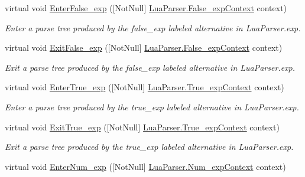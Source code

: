 \begin{DoxyCompactItemize}
virtual void \mbox{\hyperlink{classzlua_1_1_lua_base_listener_a5025dfe7f75ae2d9db0e58eadba0bba0}{Enter\+False\+\_\+exp}} (\mbox{[}Not\+Null\mbox{]} \mbox{\hyperlink{classzlua_1_1_lua_parser_1_1_false__exp_context}{Lua\+Parser.\+False\+\_\+exp\+Context}} context)
\begin{DoxyCompactList}\small\item\em Enter a parse tree produced by the {\ttfamily false\+\_\+exp} labeled alternative in Lua\+Parser.\+exp. \end{DoxyCompactList}\item 
virtual void \mbox{\hyperlink{classzlua_1_1_lua_base_listener_a6094ac0c604fce8ffab9ccfcf3023c52}{Exit\+False\+\_\+exp}} (\mbox{[}Not\+Null\mbox{]} \mbox{\hyperlink{classzlua_1_1_lua_parser_1_1_false__exp_context}{Lua\+Parser.\+False\+\_\+exp\+Context}} context)
\begin{DoxyCompactList}\small\item\em Exit a parse tree produced by the {\ttfamily false\+\_\+exp} labeled alternative in Lua\+Parser.\+exp. \end{DoxyCompactList}\item 
virtual void \mbox{\hyperlink{classzlua_1_1_lua_base_listener_a1c2fbf0cc7a011728a19e25d1cc6f967}{Enter\+True\+\_\+exp}} (\mbox{[}Not\+Null\mbox{]} \mbox{\hyperlink{classzlua_1_1_lua_parser_1_1_true__exp_context}{Lua\+Parser.\+True\+\_\+exp\+Context}} context)
\begin{DoxyCompactList}\small\item\em Enter a parse tree produced by the {\ttfamily true\+\_\+exp} labeled alternative in Lua\+Parser.\+exp. \end{DoxyCompactList}\item 
virtual void \mbox{\hyperlink{classzlua_1_1_lua_base_listener_a1f4f2a7162ad93c54ae0c86a15233bac}{Exit\+True\+\_\+exp}} (\mbox{[}Not\+Null\mbox{]} \mbox{\hyperlink{classzlua_1_1_lua_parser_1_1_true__exp_context}{Lua\+Parser.\+True\+\_\+exp\+Context}} context)
\begin{DoxyCompactList}\small\item\em Exit a parse tree produced by the {\ttfamily true\+\_\+exp} labeled alternative in Lua\+Parser.\+exp. \end{DoxyCompactList}\item 
virtual void \mbox{\hyperlink{classzlua_1_1_lua_base_listener_a76fcc42fe090e80443a7f08477fbf19f}{Enter\+Num\+\_\+exp}} (\mbox{[}Not\+Null\mbox{]} \mbox{\hyperlink{classzlua_1_1_lua_parser_1_1_num__exp_context}{Lua\+Parser.\+Num\+\_\+exp\+Context}} context)

\end{DoxyCompactItemize}
